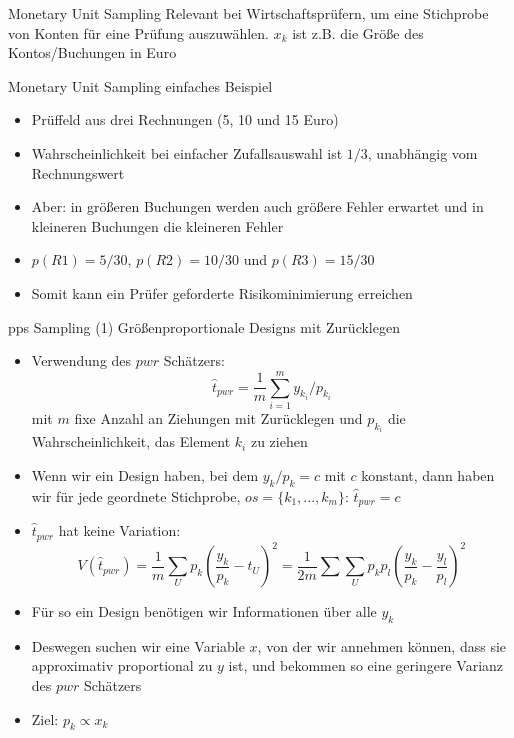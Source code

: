 \documentclass[9pt]{beamer}
\begin{document}
\begin{frame}{Monetary Unit Sampling}
Relevant bei Wirtschaftsprüfern, um eine Stichprobe von Konten für eine Prüfung auszuwählen. $x_k$ ist z.B. die Größe des Kontos/Buchungen in Euro
\begin{block}{Monetary Unit Sampling einfaches Beispiel}
	\begin{itemize}
		\item Prüffeld aus drei Rechnungen (5, 10 und 15 Euro)
		\item Wahrscheinlichkeit bei einfacher Zufallsauswahl ist $1/3$, unabhängig vom Rechnungswert
		\item Aber: in größeren Buchungen werden auch größere Fehler erwartet und in kleineren Buchungen die kleineren Fehler
		\item $p(R1) = 5/30$, $p(R2) = 10/30$ und $p(R3)=15/30$
		\item Somit kann ein Prüfer geforderte Risikominimierung erreichen
	\end{itemize}
\end{block}
\end{frame}

\begin{frame}{pps Sampling (1)}
Größenproportionale Designs mit Zurücklegen
\begin{itemize}
	\item Verwendung des $pwr$ Schätzers: $$\hat{t}_{pwr} =\frac{1}{m} \sum_{i=1}^m y_{k_i}/p_{k_i}$$ mit $m$ fixe Anzahl an Ziehungen mit Zurücklegen und $p_{k_i}$ die Wahrscheinlichkeit, das Element $k_i$ zu ziehen
	\item Wenn wir ein Design haben, bei dem $y_k/p_k=c$ mit $c$ konstant, dann haben wir für jede geordnete Stichprobe, $os = \{k_1,...,k_m\}$: $\hat{t}_{pwr} = c$ 
	\item $\hat{t}_{pwr}$ hat keine Variation:
	$$V(\hat{t}_{pwr})=\frac{1}{m} \sum_U p_k \left(\frac{y_k}{p_k}-t_U\right)^2 = \frac{1}{2m}\sum\sum_U p_k p_l\left(\frac{y_k}{p_k}-\frac{y_l}{p_l}\right)^2$$
	\item Für so ein Design benötigen wir Informationen über alle $y_k$
	\item Deswegen suchen wir eine Variable $x$, von der wir annehmen können, dass sie approximativ proportional zu $y$ ist, und bekommen so eine geringere Varianz des $pwr$ Schätzers
	\item Ziel: $p_k \propto x_k$	
\end{itemize}
\end{frame}
\end{document}
